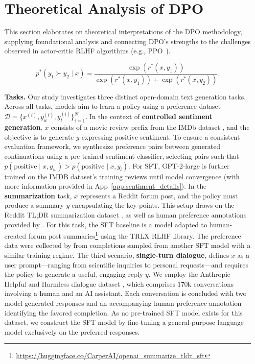 \section{Theoretical Analysis of DPO} This section elaborates on theoretical interpretations of the DPO methodology, supplying foundational analysis and connecting DPO’s strengths to the challenges observed in actor-critic RLHF algorithms (e.g., PPO~\cite{schulman2017proximal}).

\begin{equation}\label{eq:bradley-terry}
    p^*(y_1\succ y_2 \mid x)=\frac{\exp\left(r^*(x, y_1)\right)}{\exp\left(r^*(x, y_1)\right) + \exp\left(r^*(x, y_2)\right)}.
\end{equation}

\textbf{Tasks.} Our study investigates three distinct open-domain text generation tasks. Across all tasks, models aim to learn a policy using a preference dataset $\mathcal{D}=\bigl\{x^{(i)}, y_w^{(i)}, y_l^{(i)}\bigr\}_{i=1}^N$. In the context of \textbf{controlled sentiment generation}, $x$ consists of a movie review prefix from the IMDb dataset \cite{maas-EtAl:2011:ACL-HLT2011}, and the objective is to generate $y$ expressing positive sentiment. To ensure a consistent evaluation framework, we synthesize preference pairs between generated continuations using a pre-trained sentiment classifier, selecting pairs such that $p(\text{positive}\mid x,y_w)>p(\text{positive}\mid x,y_l)$. For SFT, GPT-2-large is further trained on the IMDB dataset's training reviews until model convergence (with more information provided in App~\ref{app:sentiment_details}). In the \textbf{summarization} task, $x$ represents a Reddit forum post, and the policy must produce a summary $y$ encapsulating the key points. This setup draws on the Reddit TL;DR summarization dataset \citep{volske-etal-2017-tl}, as well as human preference annotations provided by \citeauthor{stiennon2022learning}. For this task, the SFT baseline is a model adapted to human-created forum post summaries\footnote{\url{https://huggingface.co/CarperAI/openai_summarize_tldr_sft}} using the TRLX \citep{leandro_von_werra_2023_7790115} RLHF library. The preference data were collected by \citeauthor{stiennon2022learning} from completions sampled from another SFT model with a similar training regime. The third scenario, \textbf{single-turn dialogue}, defines $x$ as a user prompt—ranging from scientific inquiries to personal requests—and requires the policy to generate a useful, engaging reply $y$. We employ the Anthropic Helpful and Harmless dialogue dataset \citep{bai2022training}, which comprises 170k conversations involving a human and an AI assistant. Each conversation is concluded with two model-generated responses and an accompanying human preference annotation identifying the favored completion. As no pre-trained SFT model exists for this dataset, we construct the SFT model by fine-tuning a general-purpose language model exclusively on the preferred responses.

